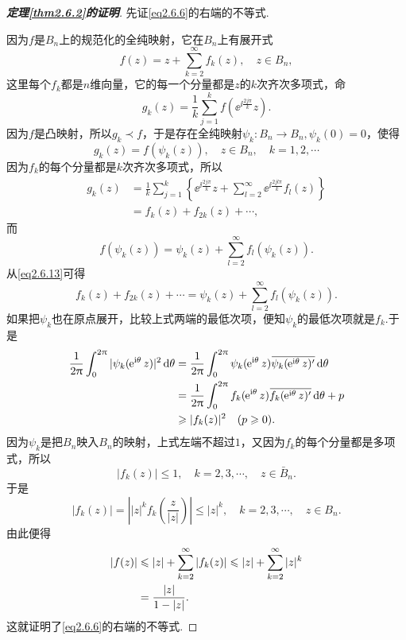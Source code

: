 \begin{proof}[\textbf{定理\ref{thm2.6.2}的证明}]
	先证\eqref{eq2.6.6}的右端的不等式.
	
	因为$f$是$B_n$上的规范化的全纯映射，它在$B_n$上有展开式
	\[f(z)=z+\sum_{k=2}^{\infty}f_k(z),\quad z\in B_n,\]
	这里每个$f_k$都是$n$维向量，它的每一个分量都是$z$的$k$次齐次多项式，命
	\[g_k(z)=\frac1k \sum_{j=1}^{k}f(\ee^{\ii\frac{2j\pi}{k}}z).\]
	因为$f$是凸映射，所以$g_k\prec f$，于是存在全纯映射$\psi_k\colon B_n\to B_n,\psi_k(0)=0$，使得
	\begin{equation}\label{eq2.6.13}
		g_k(z)=f(\psi_k(z)),\quad z\in B_n,\quad k=1,2,\cdots
	\end{equation}
因为$f_k$的每个分量都是$k$次齐次多项式，所以
\begin{align*}
	g_k(z)
	&=\frac1k\sum_{j=1}^{k}\left\{\ee^{\ii\frac{2j\pi}{k}}z+\sum_{l=2}^{\infty}\ee^{\ii\frac{2jl\pi}{k}}f_l(z)\right\}\\
	&=f_k(z)+f_{2k}(z)+\cdots,
\end{align*}
而
\[f(\psi_k(z))=\psi_k(z)+\sum_{l=2}^{\infty}f_l(\psi_k(z)).\]
从\eqref{eq2.6.13}可得
\[f_k(z)+f_{2k}(z)+\cdots=\psi_k(z)+\sum_{l=2}^{\infty}f_l(\psi_k(z)).\]
如果把$\psi_k$也在原点展开，比较上式两端的最低次项，便知$\psi_k$的最低次项就是$f_k$.于是
\begin{align*}
	\frac1{2\pi}\int_{0}^{2\pi} |\psi_k(\ee^{\ii\theta}z)|^2\dif\theta
	&=\frac1{2\pi}\int_{0}^{2\pi}\psi_k(\ee^{\ii\theta}z)\bar{\psi_k(\ee^{\ii\theta}z)'}\dif\theta\\
	&=\frac1{2\pi}\int_{0}^{2\pi} f_k(\ee^{\ii\theta}z)\bar{f_k(\ee^{\ii\theta}z)'}\dif\theta+p\\
	&\ge |f_k(z)|^2\quad(p\ge0).
\end{align*}
因为$\psi_k$是把$B_n$映入$B_n$的映射，上式左端不超过$1$，又因为$f_k$的每个分量都是多项式，所以
\[|f_k(z)|\le1,\quad k=2,3,\cdots,\quad z\in\bar{B}_n.\]
于是
\[|f_k(z)|=\left||z|^k f_k\left(\frac{z}{|z|}\right)\right|\le|z|^k,\quad k=2,3,\cdots,\quad z\in B_n.\]
由此便得
\begin{align}\label{eq2.6.14}
	|f(z)|
	&\le |z|+\sum_{k=2}^{\infty} |f_k(z)|\le|z|+\sum_{k=2}^{\infty} |z|^k\notag\\
	&=\frac{|z|}{1-|z|}.
\end{align}
这就证明了\eqref{eq2.6.6}的右端的不等式.


\end{proof}
